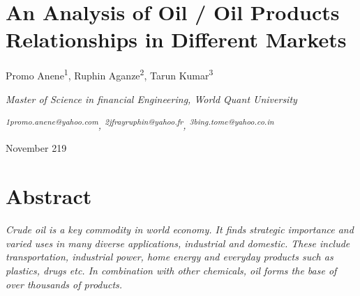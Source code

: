 \documentclass[12pt,twoside]{article}
\begin{document}
\section*{An Analysis of Oil / Oil Products Relationships in Different Markets}

\vspace{\baselineskip}
\vspace{\baselineskip}\begin{Center}
Promo Anene\textsuperscript{1}, Ruphin Aganze\textsuperscript{2}, Tarun Kumar\textsuperscript{3}
\end{Center}\par

\begin{Center}
\textit{Master of Science in financial Engineering, World Quant University}
\end{Center}\par

\begin{Center}
\textit{\textsuperscript{1\href{mailto:promo.anene@yahoo.com}{}promo.anene@yahoo.com}, \textsuperscript{2\href{mailto:jfrayruphin@yahoo.fr}{}jfrayruphin@yahoo.fr}, \textsuperscript{3\href{mailto:bing.tome@yahoo.co.in}{}bing.tome@yahoo.co.in} }
\end{Center}\par


\vspace{\baselineskip}\begin{Center}
November 219
\end{Center}\par

\setlength{\parskip}{6.0pt}
\section*{Abstract}
\begin{justify}
{\fontsize{11pt}{13.2pt}\selectfont \textit{Crude oil is a key commodity in world economy. It finds strategic importance and varied uses in many diverse applications, industrial and domestic. These include transportation, industrial power, home energy and everyday products such as plastics, drugs etc. In combination with other chemicals, oil forms the base of over thousands of products.}\par}
\end{justify}\par
\end{document}
